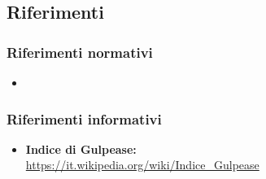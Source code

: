 \subsection{Riferimenti}

\subsubsection{Riferimenti normativi}
\begin{itemize}
	\item {}
\end{itemize}

\subsubsection{Riferimenti informativi}
\begin{itemize}
	\item \textbf{Indice di Gulpease:}\\
	\url{https://it.wikipedia.org/wiki/Indice_Gulpease}
\end{itemize}